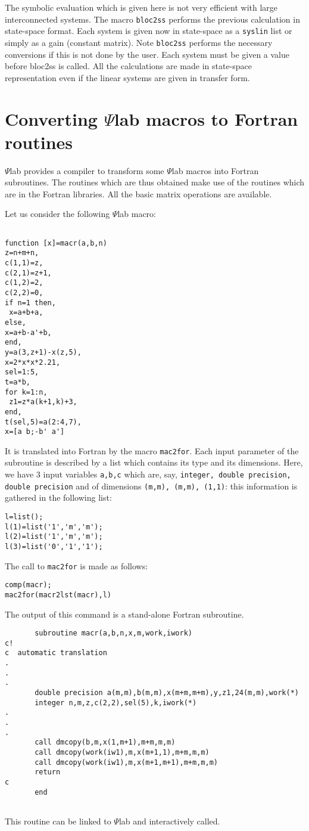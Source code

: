 The symbolic evaluation which is given here is not very efficient
with large interconnected systems. The macro {\tt bloc2ss}
performs the previous calculation in state-space format.
Each system is given now in state-space 
as a {\tt syslin} list or simply as a gain (constant matrix). 
Note {\tt bloc2ss} performs the necessary conversions if this 
is not done by the user. Each system must be given a value before
bloc2ss is called. All the calculations are made in state-space
representation even if the linear systems are given in transfer form.

\section{Converting $\Psi$lab macros to Fortran routines}

$\Psi$lab provides a compiler to transform some $\Psi$lab macros
into Fortran subroutines. The routines which are thus obtained
make use of the routines which are in the Fortran libraries.
All the basic matrix operations are available.

Let us consider the following $\Psi$lab macro:
\begin{verbatim}

function [x]=macr(a,b,n)
z=n+m+n,
c(1,1)=z,
c(2,1)=z+1,
c(1,2)=2,
c(2,2)=0,
if n=1 then,
 x=a+b+a,
else,
x=a+b-a'+b,
end,
y=a(3,z+1)-x(z,5),
x=2*x*x*2.21,
sel=1:5,
t=a*b,
for k=1:n,
 z1=z*a(k+1,k)+3,
end,
t(sel,5)=a(2:4,7),
x=[a b;-b' a']

\end{verbatim}

It is translated into Fortran by the macro {\tt mac2for}.
Each input parameter of the subroutine is described by a list
which contains its type and its dimensions. Here, we have 3
input variables {\tt a,b,c} which are, say, {\tt integer,
double precision, double precision} and of dimensions
{\tt (m,m), (m,m), (1,1)}: this information is gathered
in the following list:
\begin{verbatim}
l=list();
l(1)=list('1','m','m');
l(2)=list('1','m','m');
l(3)=list('0','1','1');
\end{verbatim}
The call to {\tt mac2for} is made as follows:
\begin{verbatim}
comp(macr);
mac2for(macr2lst(macr),l)
\end{verbatim}
The output of this command is a stand-alone Fortran subroutine.
\begin{verbatim}
       subroutine macr(a,b,n,x,m,work,iwork)
c!
c  automatic translation
.
.
.
       double precision a(m,m),b(m,m),x(m+m,m+m),y,z1,24(m,m),work(*)
       integer n,m,z,c(2,2),sel(5),k,iwork(*)
.
.
.      
       call dmcopy(b,m,x(1,m+1),m+m,m,m)
       call dmcopy(work(iw1),m,x(m+1,1),m+m,m,m)
       call dmcopy(work(iw1),m,x(m+1,m+1),m+m,m,m)
       return
c
       end


\end{verbatim}
This routine can be linked to $\Psi$lab and interactively called.

